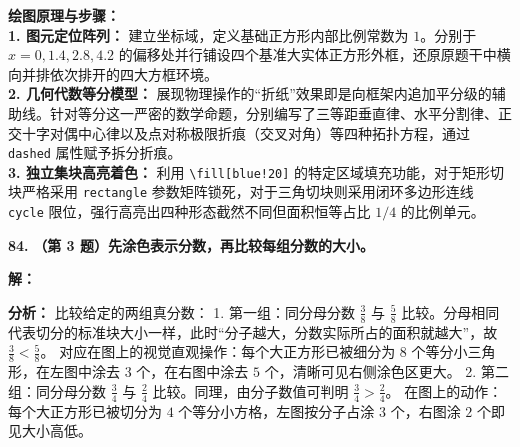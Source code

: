 \vspace{0.4cm}
{\small\color{blue!70!black}
\textbf{绘图原理与步骤：}\\
\textbf{1. 图元定位阵列：} 建立坐标域，定义基础正方形内部比例常数为 $1$。分别于 $x=0, 1.4, 2.8, 4.2$ 的偏移处并行铺设四个基准大实体正方形外框，还原原题干中横向并排依次排开的四大方框环境。\\
\textbf{2. 几何代数等分模型：} 展现物理操作的“折纸”效果即是向框架内追加平分级的辅助线。针对等分这一严密的数学命题，分别编写了三等距垂直律、水平分割律、正交十字对偶中心律以及点对称极限折痕（交叉对角）等四种拓扑方程，通过 \texttt{dashed} 属性赋予拆分折痕。\\
\textbf{3. 独立集块高亮着色：} 利用 \texttt{\textbackslash fill[blue!20]} 的特定区域填充功能，对于矩形切块严格采用 \texttt{rectangle} 参数矩阵锁死，对于三角切块则采用闭环多边形连线 \texttt{cycle} 限位，强行高亮出四种形态截然不同但面积恒等占比 $1/4$ 的比例单元。
}


\vspace{1.5cm}

\textbf{\LARGE 84.} \textbf{（第 3 题）先涂色表示分数，再比较每组分数的大小。}

\vspace{0.4cm}
\textbf{解：}

\textbf{分析：}
比较给定的两组真分数：
1. 第一组：同分母分数 $\displaystyle\frac{3}{8}$ 与 $\displaystyle\frac{5}{8}$ 比较。分母相同代表切分的标准块大小一样，此时“分子越大，分数实际所占的面积就越大”，故 $\displaystyle\frac{3}{8} < \displaystyle\frac{5}{8}$。
对应在图上的视觉直观操作：每个大正方形已被细分为 $8$ 个等分小三角形，在左图中涂去 $3$ 个，在右图中涂去 $5$ 个，清晰可见右侧涂色区更大。
2. 第二组：同分母分数 $\displaystyle\frac{3}{4}$ 与 $\displaystyle\frac{2}{4}$ 比较。同理，由分子数值可判明 $\displaystyle\frac{3}{4} > \displaystyle\frac{2}{4}$。
在图上的动作：每个大正方形已被切分为 $4$ 个等分小方格，左图按分子占涂 $3$ 个，右图涂 $2$ 个即见大小高低。

